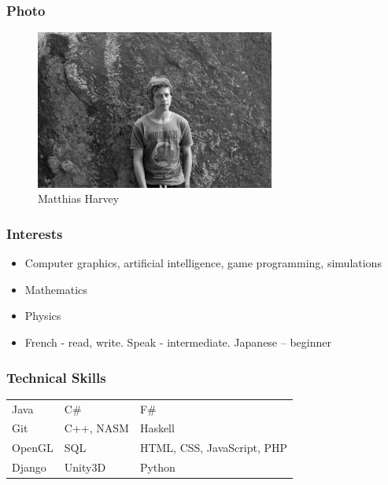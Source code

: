 \documentclass{article}
\begin{document}
	\subsubsection{Photo}
	\begin{figure}[H]
		\centering
		\includegraphics[width=0.7\textwidth]{../matthias.jpg}
		\caption{Matthias Harvey}
	\end{figure}
	\subsubsection{Interests}
	\begin{itemize}
		\item Computer graphics, artificial intelligence, game programming, simulations
		\item Mathematics
		\item Physics
		\item French - read, write. Speak - intermediate. Japanese – beginner
	\end{itemize}
	\subsubsection{Technical Skills}
	
	\begin{tabular}{| l | l | l |}
		Java   & C\#     & F\#                          \\
		Git    & C++, NASM     & Haskell                     \\
		OpenGL & SQL     & HTML, CSS, JavaScript, PHP   \\
		Django & Unity3D & Python                     
	\end{tabular}
\end{document}
